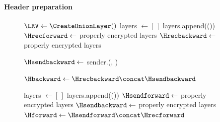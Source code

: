 \paragraph*{Header preparation} 

\begin{figure}[t]
  \begin{algorithmic}[1]
      \State $\LRV \gets \CreateOnionLayer()$
      \State layers $\gets [\,]$
        \State layers.append(\CreateOnionLayer())
      \EndWhile
      \State $\Hrecforward \gets$ properly encrypted layers
      \State $\Hrecbackward \gets$ properly encrypted layers

      \State $\Hsendbackward \gets$ sender.\Send(\Hrecforward, \LRV)

      \State $\Hbackward \gets \Hrecbackward \concat \Hsendbackward$ \label{hbackward}
    \EndFunction
  \end{algorithmic}

  \vspace{0.3em}
  \begin{algorithmic}[1]
    \Function{\Send}{\Hrecforward, \LRV}
      \State layers $\gets [\,]$
        \State layers.append(\CreateOnionLayer())
      \EndWhile
      \State $\Hsendforward \gets$ properly encrypted layers
      \State $\Hsendbackward \gets$ properly encrypted layers
      \State $\Hforward \gets \Hsendforward \concat \Hrecforward$ \label{hforward}
      \State \Return \Hsendbackward

    \EndFunction
  \end{algorithmic}


\end{figure}
